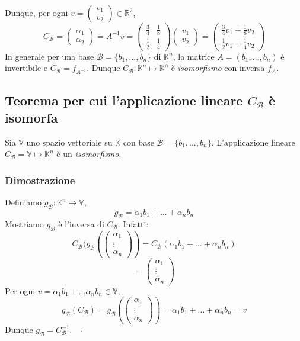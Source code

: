 \documentclass[12pt]{article}
\begin{document}
Dunque, per ogni $v = \begin{pmatrix}
    v_1\\
    v_2
\end{pmatrix} \in \mathbb{R}^2$,
\[C_{\mathcal{B}} = \begin{pmatrix}
    \alpha_1\\
    \alpha_2
\end{pmatrix} = A^{-1}v = \begin{pmatrix}
    \frac{3}{4} & \frac{1}{8}\\
    \frac{1}{2} & \frac{1}{4}
\end{pmatrix}\begin{pmatrix}
    v_1\\
    v_2
\end{pmatrix} = \begin{pmatrix}
    \frac{3}{4}v_1 + \frac{1}{8}v_2\\
    \frac{1}{2}v_1 + \frac{1}{4}v_2
\end{pmatrix}\]
In generale per una base $\mathcal{B} = \{b_1, \dots, b_n\}$ di $\mathbb{K}^n$, la matrice $A = (b_1, \dots, b_n)$ è invertibile e $C_{\mathcal{B}} = f_{A^{-1}}$. Dunque $C_{\mathcal{B}}: \mathbb{K}^n \mapsto \mathbb{K^n}$ è \textit{isomorfismo} con inversa $f_A$.

\subsection{Teorema per cui l'applicazione lineare $C_{\mathcal{B}}$ è isomorfa}

Sia $\mathbb{V}$ uno spazio vettoriale su $\mathbb{K}$ con base $\mathcal{B} = \{b_1, \dots, b_n\}$. L'applicazione lineare $C_{\mathcal{B}} = \mathbb{V} \mapsto \mathbb{K}^n$ è un \textit{isomorfismo}.

\subsubsection{Dimostrazione}

Definiamo $g_{\mathcal{B}}: \mathbb{K}^n \mapsto \mathbb{V}$,
\[g_{\mathcal{B}} = \alpha_1b_1 + \dots + \alpha_nb_n\]
Mostriamo $g_{\mathcal{B}}$ è l'inversa di $C_{\mathcal{B}}$. Infatti:
\[C_{\mathcal{B}}(g_{\mathcal{B}}\left(\begin{pmatrix}
    \alpha_1\\
    \vdots\\
    \alpha_n
\end{pmatrix}\right) = C_{\mathcal{B}}(\alpha_1b_1 + \dots + \alpha_nb_n)\]
\[= \begin{pmatrix}
    \alpha_1\\
    \vdots\\
    \alpha_n
\end{pmatrix}\]
Per ogni $v = \alpha_1b_1 + \dots \alpha_nb_n \in \mathbb{V}$,
\[g_{\mathcal{B}}(C_{\mathcal{B}}) = g_{\mathcal{B}}\left(\begin{pmatrix}
    \alpha_1\\
    \vdots\\
    \alpha_n
\end{pmatrix}\right) = \alpha_1b_1 + \dots+ \alpha_nb_n = v\]
Dunque $g_{\mathcal{B}} = C_{\mathcal{B}}^{-1}. \quad \square$
\end{document}
